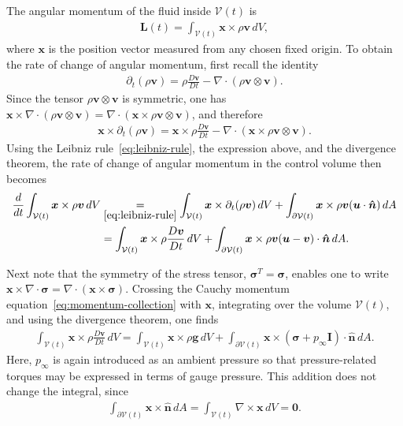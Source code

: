 The angular momentum of the fluid inside $\mathcal{V}(t)$ is
\begin{align}
    \bm{L}(t)
    =
    \int_{\mathcal{V}(t)}\bm{x}\times\rho\bm{v}\,dV,
\end{align}
where $\bm{x}$ is the position vector measured from any chosen fixed origin. To obtain the rate of change of angular momentum, first recall the identity
\begin{align}
    \partial_t(\rho\bm{v})
    =
    \rho\frac{D\bm{v}}{Dt}
    -
    \nabla\cdot(\rho\bm{v}\otimes\bm{v}).
\end{align}
Since the tensor $\rho\bm{v}\otimes\bm{v}$ is symmetric, one has $\bm{x}\times\nabla\cdot(\rho\bm{v}\otimes\bm{v})=\nabla\cdot\left(\bm{x}\times\rho\bm{v}\otimes\bm{v}\right)$, and therefore 
\begin{align}
    \bm{x}\times\partial_t(\rho\bm{v})=\bm{x}\times\rho\frac{D\bm{v}}{Dt}-\nabla\cdot\left(\bm{x}\times\rho\bm{v}\otimes\bm{v}\right).
\end{align}
Using the Leibniz rule~\eqref{eq:leibniz-rule}, the expression above, and the divergence theorem, the rate of change of angular momentum in the control volume then becomes
\begin{align}
    \frac{d}{dt}
    \int_{\mathcal{V}(t)}
    \bm{x}\times\rho\bm{v}\,dV
    &\underset{\eqref{eq:leibniz-rule}}{=}
    \int_{\mathcal{V}(t)}
    \bm{x}\times\partial_t(\rho\bm{v})\,dV
    +
    \int_{\partial\mathcal{V}(t)}
    \bm{x}\times\rho\bm{v}
    (\bm u\cdot\bm{\hat n})\,dA
    \nonumber\\
    &=
    \int_{\mathcal{V}(t)}
    \bm{x}\times\rho\frac{D\bm{v}}{Dt}\,dV
    +
    \int_{\partial\mathcal{V}(t)}
    \bm{x}\times\rho\bm{v}
    (\bm{u}-\bm{v})\cdot\bm{\hat{n}}\,dA.
\end{align}

Next note that the symmetry of the stress tensor, $\bm{\sigma}^T=\bm{\sigma}$, enables one to write $\bm{x}\times\nabla\cdot\bm{\sigma}=\nabla\cdot(\bm{x}\times\bm{\sigma})$. Crossing the Cauchy momentum equation~\eqref{eq:momentum-collection} with $\bm{x}$, integrating over the volume $\mathcal{V}(t)$, and using the divergence theorem, one finds
\begin{align}
    \int_{\mathcal{V}(t)}
    \bm{x}\times\rho\frac{D\bm{v}}{Dt}\,dV
    =
    \int_{\mathcal{V}(t)}
    \bm{x}\times\rho\bm{g}\,dV
    +
    \int_{\partial\mathcal{V}(t)}
    \bm{x}\times(\bm{\sigma}+p_\infty\bm{I})\cdot\bm{\hat{n}}\,dA.
\end{align}
Here, $p_\infty$ is again introduced as an ambient pressure so that pressure-related torques may be expressed in terms of gauge pressure. This addition does not change the integral, since
\begin{align}
    \int_{\partial\mathcal{V}(t)}\bm{x}\times\bm{\hat{n}}\,dA=\int_{\mathcal{V}(t)}\nabla\times\bm{x}\,dV=\bm{0}.
\end{align}

